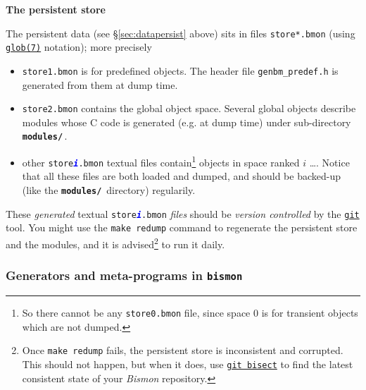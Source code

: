 {\large \textbf{The persistent store}}

The persistent data (see \S \ref{sec:datapersist} above) sits in files
 
 \texttt{store*.bmon}
(using
\href{https://man7.org/linux/man-pages/man7/glob.7.html}{\texttt{glob(7)}}
notation); more precisely

\begin{itemize}

\item \texttt{store1.bmon} is for predefined objects. The header file
  \texttt{genbm\_predef.h} is generated from them at dump time.

\item \texttt{store2.bmon} contains the global object space. Several
  global objects describe modules whose C code is generated (e.g. at
  dump time)   under sub-directory
  \textbf{\texttt{modules/}}\,.

\item other \texttt{store\textcolor{blue}{\textbf{\textit{i}}}.bmon}
  textual files contain\footnote{So there cannot be any
    \texttt{store0.bmon} file, since space 0 is for transient objects
    which are not dumped.}  objects in space ranked $i$ \ldots. Notice
  that all these files are both loaded and dumped, and should be
  backed-up (like the \textbf{\texttt{modules/}}\, directory)
  regularily.

\end{itemize}

These \emph{generated} textual
\texttt{store\textcolor{blue}{\textit{\textbf{i}}}.bmon} \emph{files}
should be \emph{version controlled} by the
\href{https://git-scm.com/}{\texttt{git}} tool. You might use the \texttt{make
  redump} command to regenerate the persistent store and the modules,
and it is advised\footnote{Once \texttt{make redump} fails, the
  persistent store is inconsistent and corrupted. This should not
  happen, but when it does, use
  \href{https://git-scm.com/docs/git-bisect}{\texttt{git bisect}} to
  find the latest consistent state of your \textit{Bismon} repository.}
to run it daily.
  
\subsubsection{Generators and meta-programs in \texttt{bismon}}

